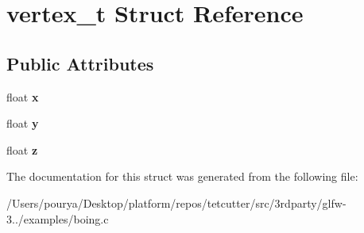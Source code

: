 \hypertarget{structvertex__t}{}\section{vertex\+\_\+t Struct Reference}
\label{structvertex__t}
\subsection*{Public Attributes}
\begin{DoxyCompactItemize}
\item 
\hypertarget{structvertex__t_a88969dedc4ad7cbb5042a779cab1faa1}{}float {\bfseries x}\label{structvertex__t_a88969dedc4ad7cbb5042a779cab1faa1}

\item 
\hypertarget{structvertex__t_a47978d5bf5e90197879ec37acc63c2a1}{}float {\bfseries y}\label{structvertex__t_a47978d5bf5e90197879ec37acc63c2a1}

\item 
\hypertarget{structvertex__t_ab55b78f5b20d1006b615622d5ca3e320}{}float {\bfseries z}\label{structvertex__t_ab55b78f5b20d1006b615622d5ca3e320}

\end{DoxyCompactItemize}


The documentation for this struct was generated from the following file\+:\begin{DoxyCompactItemize}
\item 
/\+Users/pourya/\+Desktop/platform/repos/tetcutter/src/3rdparty/glfw-\/3../examples/boing.\+c\end{DoxyCompactItemize}
